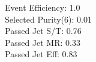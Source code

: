 Event Efficiency:   1.0\\ 
Selected Purity(6): 0.01\\ 
Passed Jet S/T:     0.76\\ 
Passed Jet MR:      0.33\\ 
Passed Jet Eff:     0.83